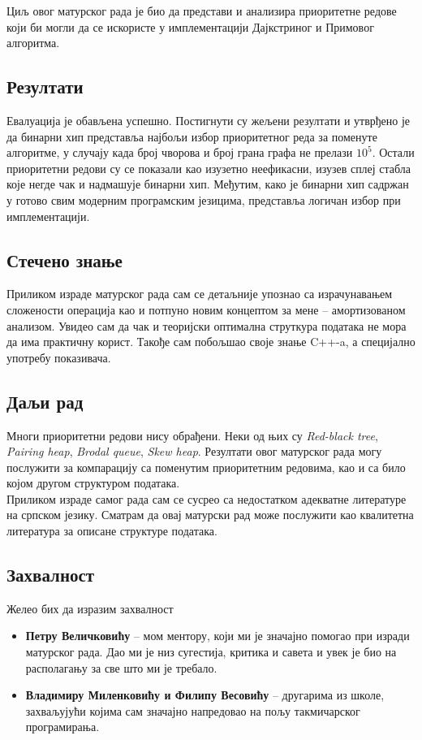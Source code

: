 \documentclass[11pt, a4paper]{article}
\theoremstyle{remark}
\numberwithin{equation}{section}
\begin{document}
	Циљ овог матурског рада је био да представи и анализира приоритетне редове који би могли да се искористе у имплементацији Дајкстриног и Примовог алгоритма.
	
	\subsection{Резултати}
	Евалуација је обављена успешно. Постигнути су жељени резултати и утврђено је да бинарни хип представља најбољи избор приоритетног реда за поменуте алгоритме, у случају када број чворова и број грана графа не прелази $10^5$. Остали приоритетни редови су се показали као изузетно неефикасни, изузев сплеј стабла које негде чак и надмашује бинарни хип. Међутим, како је бинарни хип садржан у готово свим модерним програмским језицима, представља логичан избор при имплементацији.
	
	\subsection{Стечено знање}
	Приликом израде матурског рада сам се детаљније упознао са израчунавањем сложености операција као и потпуно новим концептом за мене -- амортизованом анализом. Увидео сам да чак и теоријски оптимална струткура података не мора да има практичну корист. Такође сам побољшао своје знање C++-a, а специјално употребу показивача.
	
	\subsection{Даљи рад}
	Многи приоритетни редови нису обрађени. Неки од њих су \textit{Red-black tree}, \textit{Pairing heap}, \textit{Brodal queue}, \textit{Skew heap}. Резултати овог матурског рада могу послужити за компарацију са поменутим приоритетним редовима, као и са било којом другом структуром података. \\
	
	\noindent Приликом израде самог рада сам се сусрео са недостатком адекватне литературе на српском језику. Сматрам да овај матурски рад може послужити као квалитетна литература за описане структуре података.
	
	\subsection{Захвалност}
	Желео бих да изразим захвалност
	\begin{itemize}
		\item \textbf{Петру Величковићу} -- мом ментору, који ми је значајно помогао при изради матурског рада. Дао ми је низ сугестија, критика и савета и увек је био на располагању за све што ми је требало.
		\item \textbf{Владимиру Миленковићу и Филипу Весовићу} -- другарима из школе, захваљујући којима сам значајно напредовао на пољу такмичарског програмирања.
	\end{itemize}
	\newpage
	
\end{document}
